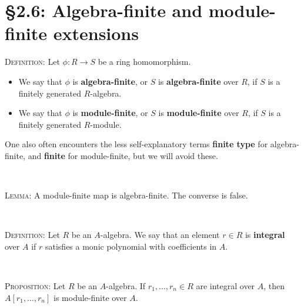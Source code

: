\documentclass[12pt]{amsart}
\newcommand{\showsol}[1]{\def\displaysol{#1}}
\begin{document}
\showsol{0}
	
	\thispagestyle{empty}
	
	\section*{\S2.6: Algebra-finite and module-finite extensions}	

\begin{framed}

\noindent \textsc{Definition:} Let $\phi:R \to S$ be a ring homomorphism.
\begin{itemize}[leftmargin=*]

\item We say that $\phi$ is \textbf{algebra-finite}, or $S$ is \textbf{algebra-finite} over $R$, if $S$ is a finitely generated $R$-algebra.
\item We say that $\phi$ is  \textbf{module-finite}, or $S$ is \textbf{module-finite} over $R$, if $S$ is a finitely generated $R$-module.
\end{itemize}
One also often encounters the less self-explanatory terms \textbf{finite type} for algebra-finite, and \textbf{finite} for module-finite, but we will avoid these.

\


\noindent \textsc{Lemma:} A module-finite map is algebra-finite. The converse is false.

\

\noindent \textsc{Definition:} Let $R$ be an $A$-algebra. We say that an element $r\in R$ is \textbf{integral} over $A$ if $r$ satisfies a monic polynomial with coefficients in $A$.

\

\noindent \textsc{Proposition:} Let $R$ be an $A$-algebra. If $r_1,\dots,r_n\in R$ are integral over $A$, then $A[r_1,\dots,r_n]$ is module-finite over $A$.
 


 
 \end{framed}
 
\end{document}
